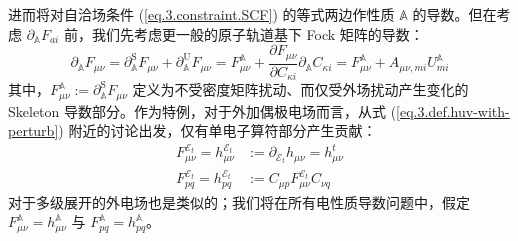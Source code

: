 进而将对自洽场条件 (\ref{eq.3.constraint.SCF}) 的等式两边作性质 $\mathbb{A}$ 的导数。但在考虑 $\partial_{\mathbb{A}} F_{ai}$ 前，我们先考虑更一般的原子轨道基下 Fock 矩阵的导数：
\begin{equation}
  \label{eq.3.deduct.pd-Fuv}
  \partial_{\mathbb{A}} F_{\mu \nu} = \partial_{\mathbb{A}}^\mathrm{S} F_{\mu \nu} + \partial_{\mathbb{A}}^\mathrm{U} F_{\mu \nu}
  = F_{\mu \nu}^{\mathbb{A}} + \frac{\partial F_{\mu \nu}}{\partial C_{\kappa i}} \partial_{\mathbb{A}} C_{\kappa i}= F_{\mu \nu}^{\mathbb{A}} + A_{\mu \nu, mi} U_{mi}^{\mathbb{A}}
\end{equation}
其中，$F_{\mu \nu}^{\mathbb{A}} := \partial_{\mathbb{A}}^\mathrm{S} F_{\mu \nu}$ 定义为不受密度矩阵扰动、而仅受外场扰动产生变化的 Skeleton 导数部分。作为特例，对于外加偶极电场而言，从式 (\ref{eq.3.def.huv-with-perturb}) 附近的讨论出发，仅有单电子算符部分产生贡献：
\begin{align}
  \label{eq.3.def.sleketon-huv}
  F_{\mu \nu}^{\mathcal{E}_t} = h_{\mu \nu}^{\mathcal{E}_t} &:= \partial_{\mathcal{E}_t} h_{\mu \nu} = h_{\mu \nu}^t \\
  F_{pq}^{\mathcal{E}_t} = h_{pq}^{\mathcal{E}_t} &:= C_{\mu p} F_{\mu \nu}^{\mathcal{E}_t} C_{\nu q}
\end{align}
对于多级展开的外电场也是类似的；我们将在所有电性质导数问题中，假定 $F_{\mu \nu}^{\mathbb{A}} = h_{\mu \nu}^{\mathbb{A}}$ 与 $F_{pq}^{\mathbb{A}} = h_{pq}^{\mathbb{A}}$。

